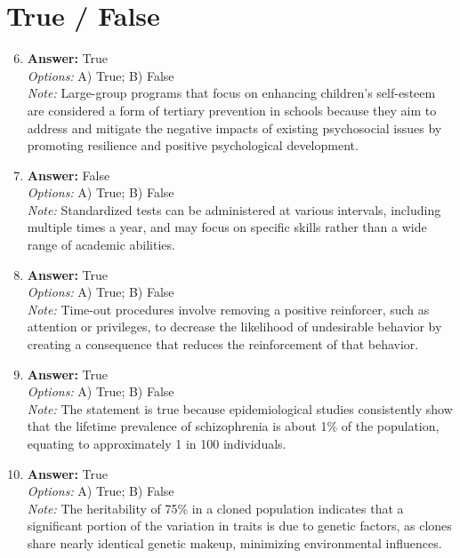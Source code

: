 \documentclass[12pt]{article}
\begin{document}
\section*{True / False}
\begin{enumerate}[label=\arabic*.]
\setcounter{enumi}{5}
\item \textbf{Answer:} True
\\ \textit{Options:} A) True; B) False
\\ \textit{Note:} Large-group programs that focus on enhancing children's self-esteem are considered a form of tertiary prevention in schools because they aim to address and mitigate the negative impacts of existing psychosocial issues by promoting resilience and positive psychological development.
\item \textbf{Answer:} False
\\ \textit{Options:} A) True; B) False
\\ \textit{Note:} Standardized tests can be administered at various intervals, including multiple times a year, and may focus on specific skills rather than a wide range of academic abilities.
\item \textbf{Answer:} True
\\ \textit{Options:} A) True; B) False
\\ \textit{Note:} Time-out procedures involve removing a positive reinforcer, such as attention or privileges, to decrease the likelihood of undesirable behavior by creating a consequence that reduces the reinforcement of that behavior.
\item \textbf{Answer:} True
\\ \textit{Options:} A) True; B) False
\\ \textit{Note:} The statement is true because epidemiological studies consistently show that the lifetime prevalence of schizophrenia is about 1\% of the population, equating to approximately 1 in 100 individuals.
\item \textbf{Answer:} True
\\ \textit{Options:} A) True; B) False
\\ \textit{Note:} The heritability of 75\% in a cloned population indicates that a significant portion of the variation in traits is due to genetic factors, as clones share nearly identical genetic makeup, minimizing environmental influences.
\end{enumerate}
\end{document}
